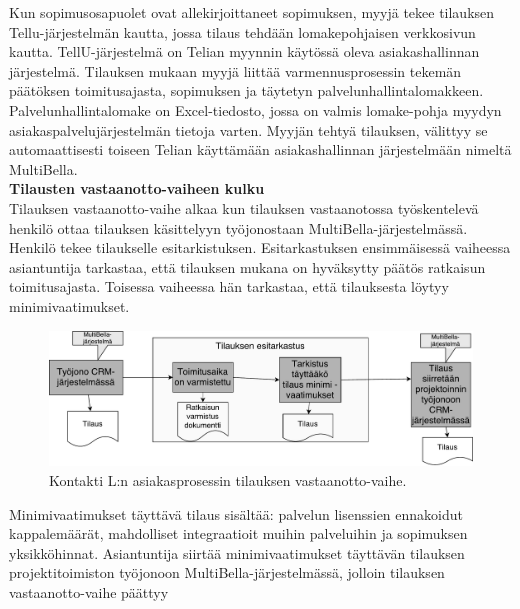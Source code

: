 \documentclass[finnish,12pt,a4paper,pdftex]{article}
\begin{document}
Kun sopimusosapuolet ovat allekirjoittaneet sopimuksen, myyjä tekee tilauksen Tellu-järjestelmän kautta, jossa tilaus tehdään lomakepohjaisen verkkosivun kautta. TellU-järjestelmä on Telian myynnin käytössä oleva asiakashallinnan järjestelmä. Tilauksen mukaan myyjä liittää varmennusprosessin tekemän päätöksen toimitusajasta, sopimuksen ja täytetyn palvelunhallintalomakkeen. Palvelunhallintalomake on Excel-tiedosto, jossa on valmis lomake-pohja myydyn asiakaspalvelujärjestelmän tietoja varten. Myyjän tehtyä tilauksen, välittyy se automaattisesti toiseen Telian käyttämään asiakashallinnan järjestelmään nimeltä MultiBella.\\

\textbf{Tilausten vastaanotto-vaiheen kulku}\\


Tilauksen vastaanotto-vaihe alkaa kun tilauksen vastaanotossa työskentelevä henkilö ottaa tilauksen käsittelyyn työjonostaan MultiBella-järjestelmässä. Henkilö tekee tilaukselle esitarkistuksen. Esitarkastuksen ensimmäisessä vaiheessa asiantuntija tarkastaa, että tilauksen mukana on hyväksytty päätös ratkaisun toimitusajasta. Toisessa vaiheessa hän tarkastaa, että tilauksesta löytyy minimivaatimukset.\\

\begin{figure}[!h]
    \centering
    \includegraphics[scale=0.4]{images/tilvast.pdf}
    \caption{Kontakti L:n asiakasprosessin tilauksen vastaanotto-vaihe.}
    \label{fig:tilausvast}
\end{figure}

Minimivaatimukset täyttävä tilaus sisältää: palvelun lisenssien ennakoidut kappalemäärät, mahdolliset integraatioit muihin palveluihin ja sopimuksen yksikköhinnat. Asiantuntija siirtää minimivaatimukset täyttävän tilauksen projektitoimiston työjonoon MultiBella-järjestelmässä, jolloin tilauksen vastaanotto-vaihe päättyy\\
\end{document}
